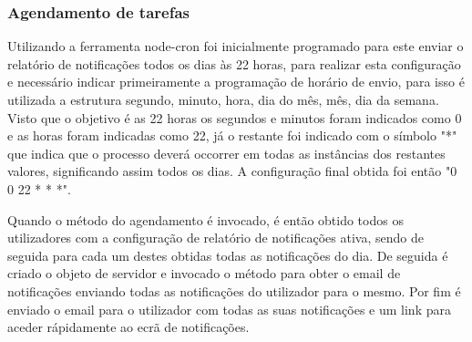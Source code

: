 \subsubsection{Agendamento de tarefas}

Utilizando a ferramenta node-cron foi inicialmente programado para este enviar o relatório de notificações todos os dias às 22 horas, para realizar esta configuração e necessário indicar primeiramente a programação de horário de envio, para isso é utilizada a estrutura segundo, minuto, hora, dia do mês, mês, dia da semana. Visto que o objetivo é as 22 horas os segundos e minutos foram indicados como 0 e as horas foram indicadas como 22, já o restante foi indicado com o símbolo "*" que indica que o processo deverá occorrer em todas as instâncias dos restantes valores, significando assim todos os dias. A configuração final obtida foi então "0 0 22 * * *".

Quando o método do agendamento é invocado, é então obtido todos os utilizadores com a configuração de relatório de notificações ativa, sendo de seguida para cada um destes obtidas todas as notificações do dia. De seguida é criado o objeto de servidor e invocado o método para obter o email de notificações enviando todas as notificações do utilizador para o mesmo. Por fim é enviado o email para o utilizador com todas as suas notificações e um link para aceder rápidamente ao ecrã de notificações.